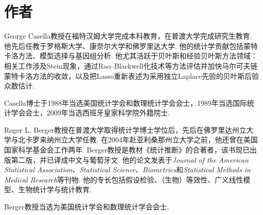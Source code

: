\section*{作者}\label{front:authors}
George Casella教授在福特汉姆大学完成本科教育，在普渡大学完成研究生教育. 他先后任教于罗格斯大学、康奈尔大学和佛罗里达大学. 他的统计学贡献包括蒙特卡洛方法、模型选择与基因组分析. 他尤其活跃于贝叶斯和经验贝叶斯方法领域：相关工作涉及Stein现象，通过Rao--Blackwell化技术等方法评估并加快马尔可夫链蒙特卡洛方法的收敛，以及把Lasso重新表述为采用独立Laplace先验的贝叶斯后验众数估计.

Casella博士于1988年当选美国统计学会和数理统计学会会士，1989年当选国际统计学会会士，2009年当选西班牙皇家科学院外籍院士.

Roger L. Berger教授在普渡大学取得统计学博士学位后，先后在佛罗里达州立大学与北卡罗来纳州立大学任教. 在2004年赴亚利桑那州立大学之前，他还曾在美国国家科学基金会工作两年. Berger教授是教材《统计推断》的合著者，该书现已出版第二版，并已译成中文与葡萄牙文. 他的论文发表于\textit{Journal of the American Statistical Association}、\textit{Statistical Science}、\textit{Biometrics}和\textit{Statistical Methods in Medical Research}等刊物. 他的专长包括假设检验、（生物）等效性、广义线性模型、生物统计学与统计教育.

Berger教授当选为美国统计学会和数理统计学会会士.
